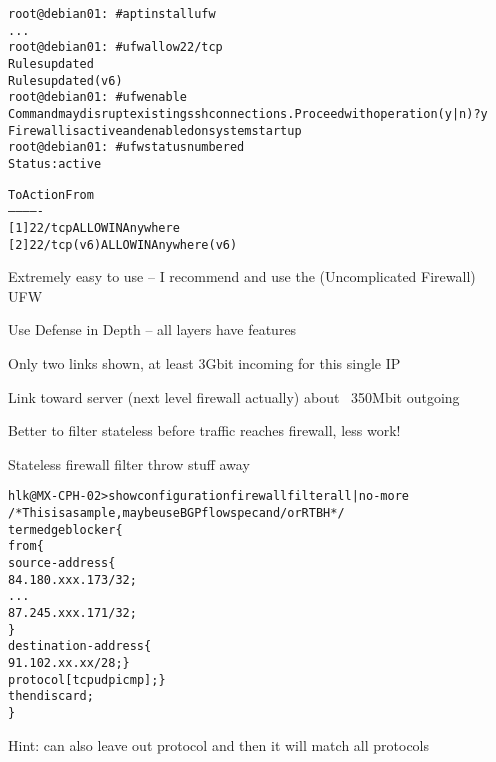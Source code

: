 \documentclass[Screen16to9,17pt]{foils}
\begin{document}

\begin{alltt}\small
root@debian01:~# apt install ufw
...
root@debian01:~# ufw allow 22/tcp
Rules updated
Rules updated (v6)
root@debian01:~# ufw enable
Command may disrupt existing ssh connections. Proceed with operation (y|n)? y
Firewall is active and enabled on system startup
root@debian01:~# ufw status numbered
Status: active

     To                         Action      From
     --                         ------      ----
[ 1] 22/tcp                     ALLOW IN    Anywhere
[ 2] 22/tcp (v6)                ALLOW IN    Anywhere (v6)
\end{alltt}

\begin{list2}
\item Extremely easy to use -- I recommend and use the (Uncomplicated Firewall) UFW
\end{list2}





\centerline{Use Defense in Depth -- all layers have features}




\centerline{Only two links shown, at least 3Gbit incoming for this single IP}

\centerline{Link toward server (next level firewall actually) about ~350Mbit outgoing}

Better to filter stateless before traffic reaches firewall, less work!



Stateless firewall filter throw stuff away

\begin{alltt}\footnotesize
hlk@MX-CPH-02> show configuration firewall filter all | no-more
/* This is a sample, maybe use BGP flowspec and/or RTBH */
term edgeblocker \{
    from \{
        source-address \{
            84.180.xxx.173/32;
...
            87.245.xxx.171/32;
        \}
        destination-address \{
            91.102.xx.xx/28; \}
        protocol [ tcp udp icmp ]; \}
    then discard;
\}
\end{alltt}
Hint: can also leave out protocol and then it will match all protocols
\end{document}
